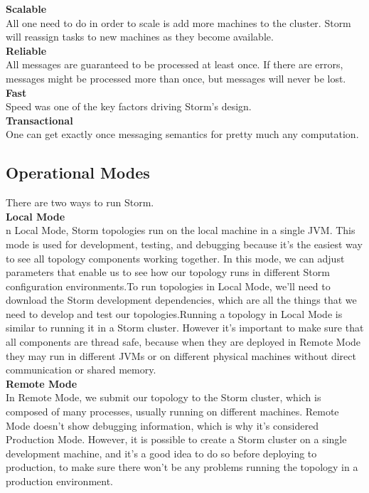 {\bfseries Scalable}\\[2mm]
All one need to do in order to scale is add more machines to the cluster. Storm will
reassign tasks to new machines as they become available.\\[2mm]
{\bfseries Reliable}\\[2mm]
All messages are guaranteed to be processed at least once. If there are errors, messages
might be processed more than once, but messages will never be lost.\\[2mm]
{\bfseries Fast}\\[2mm]
Speed was one of the key factors driving Storm's design.\\[2mm]
{\bfseries Transactional}\\[2mm]
One can get exactly once messaging semantics for pretty much any computation.\\[2mm]

\subsection{Operational Modes}
There are two ways to run Storm.\\[2mm]
{\bfseries Local Mode}\\[2mm]
n Local Mode, Storm topologies run on the local machine in a single JVM. This mode is used for development, testing, and debugging because it's the easiest way to see all topology components working together. In this mode, we can adjust parameters that enable us to see how our topology runs in different Storm configuration environments.To run topologies in Local Mode, we'll need to download the Storm development dependencies, which are all the things that we need to develop and test our topologies.Running a topology in Local Mode is similar to running it in a Storm cluster. However it's important to make sure that all components are thread safe, because when they are deployed in Remote Mode they may run in different JVMs or on different physical machines without direct communication or shared memory.\\[2mm]
{\bfseries Remote Mode}\\[2mm]
In Remote Mode, we submit our topology to the Storm cluster, which is composed of many processes, usually running on different machines. Remote Mode doesn't show debugging information, which is why it's considered Production Mode. However, it is possible to create a Storm cluster on a single development machine, and it's a good idea to do so before deploying to production, to make sure there won't be any problems running the topology in a production environment.\\[2mm]
